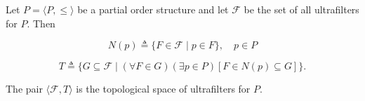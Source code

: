 Let $P = \langle P, \leq \rangle$ be a partial order structure and let $\mathcal{F}$ be the set of all ultrafilters for $P$. Then

$$N(p) \triangleq \{F \in \mathcal{F} \mid p \in F\}, \quad p \in P$$

$$T \triangleq \{G \subseteq \mathcal{F} \mid (\forall F \in G)(\exists p \in P)[F \in N(p) \subseteq G]\}.$$

The pair $\langle \mathcal{F}, T \rangle$ is the topological space of ultrafilters for $P$.
